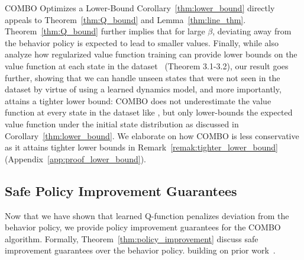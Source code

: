 \begin{subsection}{COMBO Optimizes a Lower-Bound}
Corollary~\ref{thm:lower_bound} directly appeals to Theorem~\ref{thm:Q_bound} and Lemma~\ref{thm:line_thm}.
Theorem~\ref{thm:Q_bound} further implies that for large $\beta$, deviating away from the behavior policy is expected to lead to smaller values. Finally, while \citet{kumar2020conservative} also analyze how regularized value function training can provide lower bounds on the value function at each state in the dataset~\citep{kumar2020conservative} (Theorem 3.1-3.2), our result goes further, showing that we can handle unseen states that were not seen in the dataset by virtue of using a learned dynamics model, and more importantly, attains a tighter lower bound: COMBO does not underestimate the value function at every state in the dataset like \citet{kumar2020conservative}, but only lower-bounds the expected value function under the initial state distribution as discussed in Corollary~\ref{thm:lower_bound}. We elaborate on how COMBO is less conservative as it attains tighter lower bounds in Remark~\ref{remak:tighter_lower_bound} (Appendix~\ref{app:proof_lower_bound}).

\subsection{Safe Policy Improvement Guarantees}
\label{sec:policy_improvement_theory}
Now that we have shown that learned Q-function penalizes deviation from the behavior policy, we provide policy improvement guarantees for the COMBO algorithm. Formally, Theorem~\ref{thm:policy_improvement} discuss safe improvement guarantees over the behavior policy. building on prior work~\citep{petrik2016safe,laroche2019safe,kumar2020conservative}. 


\end{subsection}
